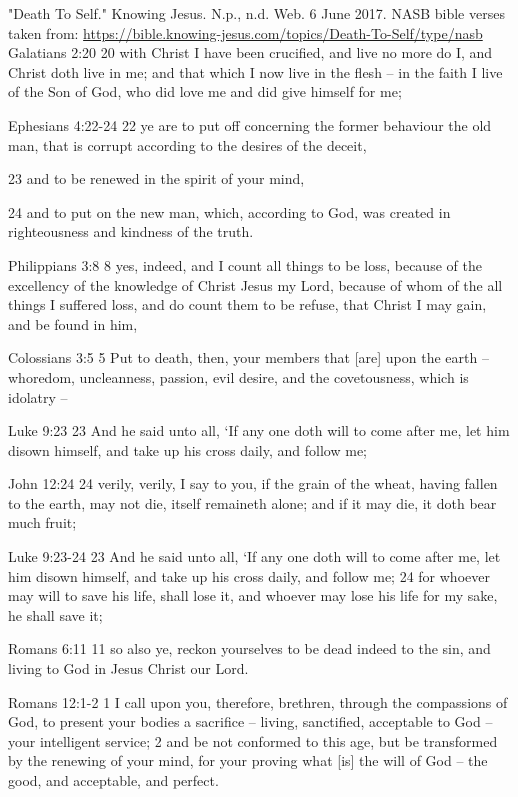 \documentclass[11pt]{article}
\begin{document}
\medskip
\begin{thebibliography}{37}
"Death To Self." Knowing Jesus. N.p., n.d. Web. 6 June 2017.
NASB bible verses taken from: \url{https://bible.knowing-jesus.com/topics/Death-To-Self/type/nasb}
Galatians 2:20
20 with Christ I have been crucified, and live no more do I, and Christ doth live in me; and that which I now live in the flesh -- in the faith I live of the Son of God, who did love me and did give himself for me;

Ephesians 4:22-24
22 ye are to put off concerning the former behaviour the old man, that is corrupt according to the desires of the deceit,

23 and to be renewed in the spirit of your mind,

24 and to put on the new man, which, according to God, was created in righteousness and kindness of the truth.

Philippians 3:8
8 yes, indeed, and I count all things to be loss, because of the excellency of the knowledge of Christ Jesus my Lord, because of whom of the all things I suffered loss, and do count them to be refuse, that Christ I may gain, and be found in him,

Colossians 3:5
5 Put to death, then, your members that [are] upon the earth -- whoredom, uncleanness, passion, evil desire, and the covetousness, which is idolatry --

Luke 9:23
23 And he said unto all, `If any one doth will to come after me, let him disown himself, and take up his cross daily, and follow me;

John 12:24
24 verily, verily, I say to you, if the grain of the wheat, having fallen to the earth, may not die, itself remaineth alone; and if it may die, it doth bear much fruit;

Luke 9:23-24
23 And he said unto all, `If any one doth will to come after me, let him disown himself, and take up his cross daily, and follow me;
24 for whoever may will to save his life, shall lose it, and whoever may lose his life for my sake, he shall save it;

Romans 6:11
11 so also ye, reckon yourselves to be dead indeed to the sin, and living to God in Jesus Christ our Lord.

Romans 12:1-2
1 I call upon you, therefore, brethren, through the compassions of God, to present your bodies a sacrifice -- living, sanctified, acceptable to God -- your intelligent service;
2 and be not conformed to this age, but be transformed by the renewing of your mind, for your proving what [is] the will of God -- the good, and acceptable, and perfect.


\end{thebibliography}
\end{document}
